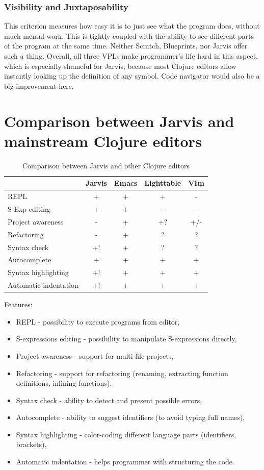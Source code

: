 \documentclass[11pt]{scrartcl}
\begin{document}
\subsubsection{Visibility and Juxtaposability}
This criterion measures how easy it is to just see what the program does, without much mental work. This is tightly coupled with the ability to see different parts of the program at the same time.
Neither Scratch, Blueprints, nor Jarvis offer such a thing. Overall, all three VPLs make programmer’s life hard in this aspect, which is especially shameful for Jarvis, because most Clojure editors allow instantly looking up the definition of any symbol. Code navigator would also be a big improvement here.

\section{Comparison between Jarvis and mainstream Clojure editors}
\begin{table}[hbt]
  \begin{tabular}{l|cccc}
    & Jarvis & Emacs & Lighttable & VIm \\
    \hline
    REPL & + & + & + & - \\
    S-Exp editing & + & + & - & - \\
    Project awareness & - & + & +? & +/- \\
    Refactoring & - & + & ? & ? \\
    Syntax check & +! & + & ? & ? \\
    Autocomplete & + & + & + & + \\
    Syntax highlighting & +! & + & + & + \\
    Automatic indentation & +! & + & + & + \\
  \end{tabular}
  \caption{Comparison between Jarvis and other Clojure editors}
\end{table}
Features:
\begin{itemize}
  \item REPL - possibility to execute programs from editor,
  \item S-expressions editing - possibility to manipulate S-expressions directly,
  \item Project awareness - support for multi-file projects,
  \item Refactoring - support for refactoring (renaming, extracting function definitions, inlining functions).
  \item Syntax check - ability to detect and present possible errors,
  \item Autocomplete - ability to suggest identifiers (to avoid typing full names),
  \item Syntax highlighting - color-coding different language parts (identifiers, brackets),
  \item Automatic indentation - helps programmer with structuring the code.
\end{itemize}
\end{document}
